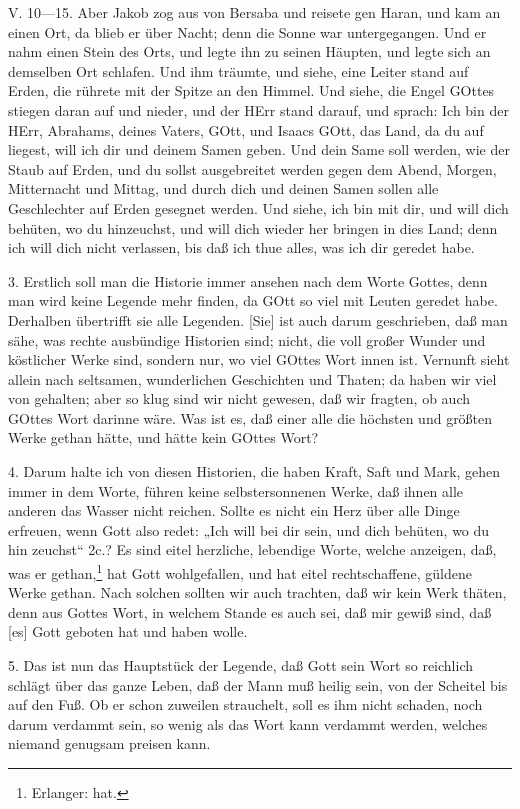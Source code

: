 V. 10—15. Aber Jakob zog aus von Bersaba und reisete gen Haran, und kam an einen Ort, da blieb er über Nacht; denn die Sonne war untergegangen. Und er nahm einen Stein des Orts, und legte ihn zu seinen Häupten, und legte sich an demselben Ort schlafen. Und ihm träumte, und siehe, eine Leiter stand auf Erden, die rührete mit der Spitze an den Himmel. Und siehe, die Engel GOttes stiegen daran auf und nieder, und der HErr stand darauf, und sprach: Ich bin der HErr, Abrahams, deines Vaters, GOtt, und Isaacs GOtt, das Land, da du auf liegest, will ich dir und deinem Samen geben. Und dein Same soll werden, wie der Staub auf Erden, und du sollst ausgebreitet werden gegen dem Abend, Morgen, Mitternacht und Mittag, und durch dich und deinen Samen sollen alle Geschlechter auf Erden gesegnet werden. Und siehe, ich bin mit dir, und will dich behüten, wo du hinzeuchst, und will dich wieder her bringen in dies Land; denn ich will dich nicht verlassen, bis daß ich thue alles, was ich dir geredet habe.

3. Erstlich soll man die Historie immer ansehen nach dem Worte Gottes, denn man wird keine Legende mehr finden, da GOtt so viel mit Leuten geredet habe. Derhalben übertrifft sie alle Legenden. [Sie] ist auch darum geschrieben, daß man sähe, was rechte ausbündige Historien sind; nicht, die voll großer Wunder und köstlicher Werke sind, sondern nur, wo viel GOttes Wort innen ist. Vernunft sieht allein nach seltsamen, wunderlichen Geschichten und Thaten; da haben wir viel von gehalten; aber so klug sind wir nicht gewesen, daß wir fragten, ob auch GOttes Wort darinne wäre. Was ist es, daß einer alle die höchsten und größten Werke gethan hätte, und hätte kein GOttes Wort?

4. Darum halte ich von diesen Historien, die haben Kraft, Saft und Mark, gehen immer in dem Worte, führen keine selbstersonnenen Werke, daß ihnen alle anderen das Wasser nicht reichen. Sollte es nicht ein Herz über alle Dinge erfreuen, wenn Gott also redet: „Ich will bei dir sein, und dich behüten, wo du hin zeuchst“ 2c.? Es sind eitel herzliche, lebendige Worte, welche anzeigen, daß, was er gethan,\footnote{Erlanger: hat.} hat Gott wohlgefallen, und hat eitel rechtschaffene, güldene Werke gethan. Nach solchen sollten wir auch trachten, daß wir kein Werk thäten, denn aus Gottes Wort, in welchem Stande es auch sei, daß mir gewiß sind, daß [es] Gott geboten hat und haben wolle.

5. Das ist nun das Hauptstück der Legende, daß Gott sein Wort so reichlich schlägt über das ganze Leben, daß der Mann muß heilig sein, von der Scheitel bis auf den Fuß. Ob er schon zuweilen strauchelt, soll es ihm nicht schaden, noch darum verdammt sein, so wenig als das Wort kann verdammt werden, welches niemand genugsam preisen kann.

